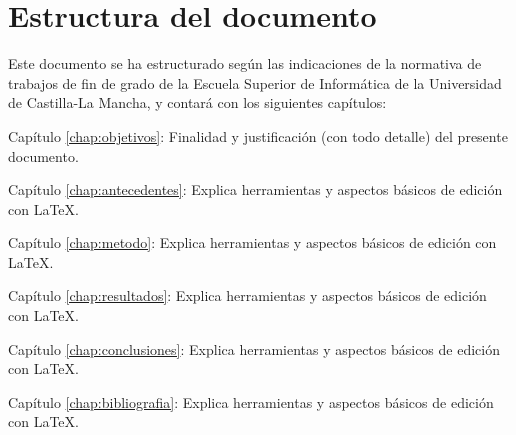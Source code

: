   \section{Estructura del documento}

  Este documento se ha estructurado según las indicaciones de la normativa de trabajos de fin de grado de la Escuela Superior de Informática de la Universidad de Castilla-La Mancha, y contará con  los siguientes capítulos:
  \begin{definitionlist}
  \item[Capítulo \ref{chap:objetivos}: \nameref{chap:objetivos}] Finalidad y justificación  (con todo detalle) del presente documento.
  \item[Capítulo \ref{chap:antecedentes}: \nameref{chap:antecedentes}] Explica herramientas y aspectos básicos de edición con \LaTeX.
  \item[Capítulo \ref{chap:metodo}: \nameref{chap:metodo}] Explica herramientas y aspectos básicos de edición con \LaTeX.
  \item[Capítulo \ref{chap:resultados}: \nameref{chap:resultados}] Explica herramientas y aspectos básicos de edición con \LaTeX.
  \item[Capítulo \ref{chap:conclusiones}: \nameref{chap:conclusiones}] Explica herramientas y aspectos básicos de edición con \LaTeX.
  \item[Capítulo \ref{chap:bibliografia}: \nameref{chap:bibliografia}] Explica herramientas y aspectos básicos de edición con \LaTeX.
  \end{definitionlist}



